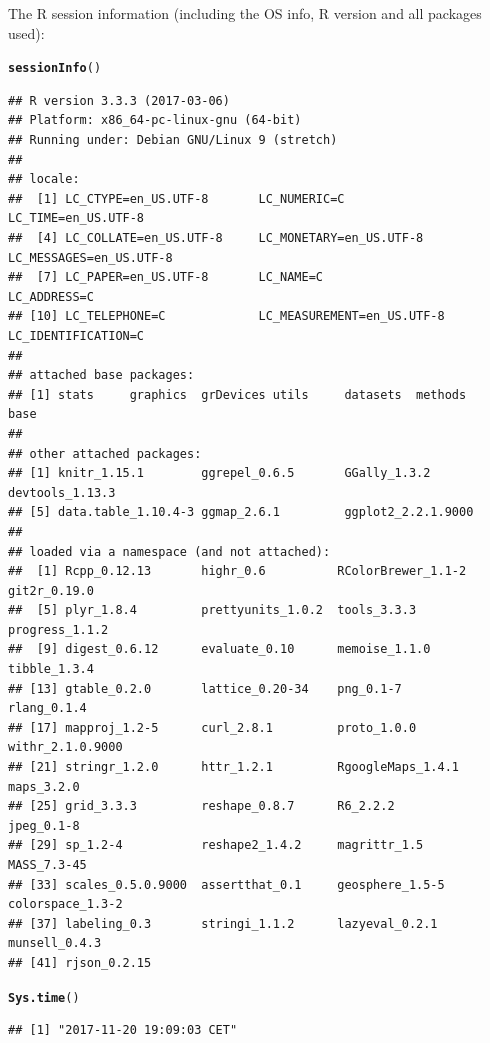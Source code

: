 \documentclass{article}\usepackage[]{graphicx}\usepackage[]{color}
\makeatletter
\newcommand{\hlstd}[1]{\textcolor[rgb]{0.345,0.345,0.345}{#1}}%
\newcommand{\hlkwd}[1]{\textcolor[rgb]{0.737,0.353,0.396}{\textbf{#1}}}%
\newenvironment{kframe}{%
 \def\at@end@of@kframe{}%
 \ifinner\ifhmode%
  \def\at@end@of@kframe{\end{minipage}}%
  \begin{minipage}{\columnwidth}%
 \fi\fi%
 \def\FrameCommand##1{\hskip\@totalleftmargin \hskip-\fboxsep
 \colorbox{shadecolor}{##1}\hskip-\fboxsep
     \hskip-\linewidth \hskip-\@totalleftmargin \hskip\columnwidth}%
 \MakeFramed {\advance\hsize-\width
   \@totalleftmargin\z@ \linewidth\hsize
   \@setminipage}}%
 {\par\unskip\endMakeFramed%
 \at@end@of@kframe}
\newenvironment{knitrout}{}{} %
\makeatother
\begin{document}
The R session information (including the OS info, R version and all
packages used):

\begin{knitrout}
\color{fgcolor}\begin{kframe}
\begin{alltt}
\hlkwd{sessionInfo}\hlstd{()}
\end{alltt}
\begin{verbatim}
## R version 3.3.3 (2017-03-06)
## Platform: x86_64-pc-linux-gnu (64-bit)
## Running under: Debian GNU/Linux 9 (stretch)
## 
## locale:
##  [1] LC_CTYPE=en_US.UTF-8       LC_NUMERIC=C               LC_TIME=en_US.UTF-8       
##  [4] LC_COLLATE=en_US.UTF-8     LC_MONETARY=en_US.UTF-8    LC_MESSAGES=en_US.UTF-8   
##  [7] LC_PAPER=en_US.UTF-8       LC_NAME=C                  LC_ADDRESS=C              
## [10] LC_TELEPHONE=C             LC_MEASUREMENT=en_US.UTF-8 LC_IDENTIFICATION=C       
## 
## attached base packages:
## [1] stats     graphics  grDevices utils     datasets  methods   base     
## 
## other attached packages:
## [1] knitr_1.15.1        ggrepel_0.6.5       GGally_1.3.2        devtools_1.13.3    
## [5] data.table_1.10.4-3 ggmap_2.6.1         ggplot2_2.2.1.9000 
## 
## loaded via a namespace (and not attached):
##  [1] Rcpp_0.12.13       highr_0.6          RColorBrewer_1.1-2 git2r_0.19.0      
##  [5] plyr_1.8.4         prettyunits_1.0.2  tools_3.3.3        progress_1.1.2    
##  [9] digest_0.6.12      evaluate_0.10      memoise_1.1.0      tibble_1.3.4      
## [13] gtable_0.2.0       lattice_0.20-34    png_0.1-7          rlang_0.1.4       
## [17] mapproj_1.2-5      curl_2.8.1         proto_1.0.0        withr_2.1.0.9000  
## [21] stringr_1.2.0      httr_1.2.1         RgoogleMaps_1.4.1  maps_3.2.0        
## [25] grid_3.3.3         reshape_0.8.7      R6_2.2.2           jpeg_0.1-8        
## [29] sp_1.2-4           reshape2_1.4.2     magrittr_1.5       MASS_7.3-45       
## [33] scales_0.5.0.9000  assertthat_0.1     geosphere_1.5-5    colorspace_1.3-2  
## [37] labeling_0.3       stringi_1.1.2      lazyeval_0.2.1     munsell_0.4.3     
## [41] rjson_0.2.15
\end{verbatim}
\begin{alltt}
\hlkwd{Sys.time}\hlstd{()}
\end{alltt}
\begin{verbatim}
## [1] "2017-11-20 19:09:03 CET"
\end{verbatim}
\end{kframe}
\end{knitrout}
\end{document}
